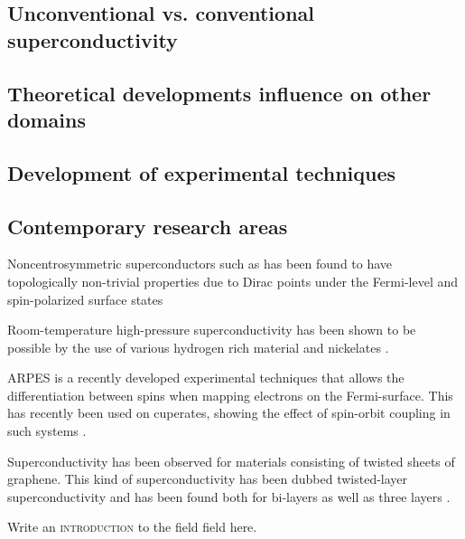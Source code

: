 \subsection{Unconventional vs. conventional superconductivity}



\subsection{Theoretical developments influence on other domains}

\subsection{Development of experimental techniques}



\subsection{Contemporary research areas}

Noncentrosymmetric superconductors such as  has been found to have topologically non-trivial properties
due to Dirac points under the Fermi-level and spin-polarized surface states \cite{Neupane16}

Room-temperature high-pressure superconductivity has been shown to be possible by the use of various hydrogen rich material
\cite{Semenok20, Snider20} and nickelates \cite{Si20}.

ARPES is a recently developed experimental techniques that allows the differentiation between spins when mapping electrons on the
Fermi-surface. This has recently been used on cuperates, showing the effect of spin-orbit coupling in such systems \cite{Gotlieb18}.

Superconductivity has been observed for materials consisting of twisted sheets of graphene. This kind of superconductivity has been dubbed
twisted-layer superconductivity and has been found both for bi-layers as well as three layers \cite{Park21}.

Write an \textsc{introduction} to the field {\prefixFont field} here. 
